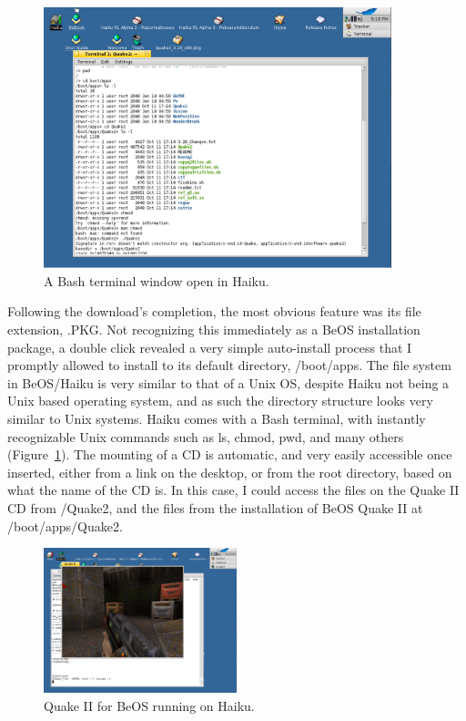 \documentclass{article}
\newcommand{\figref}[1]{Figure~\ref{fig:#1}}
\begin{document}
\begin{figure}[h]
\centering
\includegraphics[width=0.9\textwidth]{figs/using-terminal.png}
\caption{A Bash terminal window open in Haiku.}
\label{fig:using-terminal}
\end{figure}

Following the download's completion, the most obvious feature was
its file extension, .PKG. Not recognizing this immediately as a BeOS
installation package, a double click revealed a very simple auto-install
process that I promptly allowed to install to its default directory,
/boot/apps.  The file system in BeOS/Haiku is very similar to that of
a Unix OS, despite Haiku not being a Unix based operating system, and as
such the directory structure looks very similar to Unix systems.
Haiku comes with a Bash terminal, with instantly recognizable Unix commands
such as ls, chmod, pwd, and many others (\figref{using-terminal}).  The
mounting of a CD is automatic, and very easily accessible once
inserted, either from a link on the desktop, or from the root
directory, based on what the name of the CD is.  In this case, I could
access the files on the Quake II CD from /Quake2, and the files from
the installation of BeOS Quake II at /boot/apps/Quake2.

\begin{figure}[h]
\centering
\includegraphics[width=0.5\textwidth]{figs/using-quake-play.png}
\caption{Quake II for BeOS running on Haiku.}
\label{fig:using-quake-play}
\end{figure}
	
\end{document}
